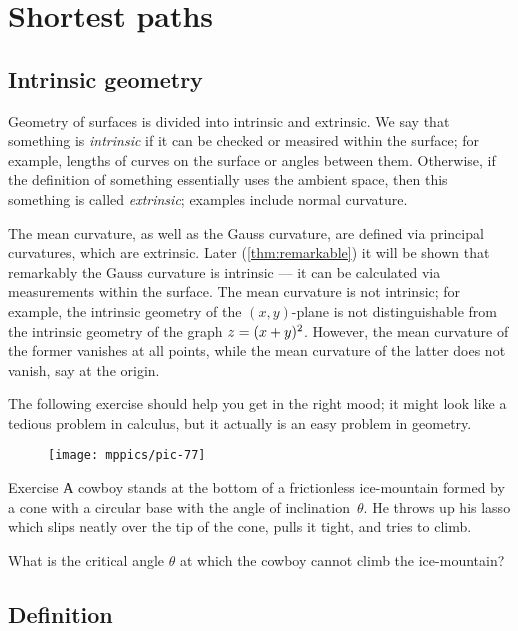 \chapter{Shortest paths}
\label{chap:shortest}

\section{Intrinsic geometry}

Geometry of surfaces is divided into intrinsic and extrinsic.
We say that something is \emph{intrinsic} if it can be checked or measired within the surface;
for example, lengths of curves on the surface or angles between them.
Otherwise, if the definition of something essentially uses the ambient space, then this something is called \emph{extrinsic};
examples include normal curvature.

The mean curvature, as well as the Gauss curvature, are defined via principal curvatures, which are extrinsic.
Later (\ref{thm:remarkable}) it will be shown that remarkably the Gauss curvature is intrinsic --- it can be calculated via measurements within the surface.
The mean curvature is not intrinsic; for example, the intrinsic geometry of the $(x,y)$-plane is not distinguishable from the intrinsic geometry of the graph $z\z=(x+y)^2$.
However, the mean curvature of the former vanishes at all points, while the mean curvature of the latter does not vanish, say at the origin.  

The following exercise should help you get in the right mood;
it might look like a tedious problem in calculus, but it actually is an easy problem in geometry.

\begin{wrapfigure}[6]{r}{33 mm}
\vskip-0mm
\centering
\texttt{[image: mppics/pic-77]}
\vskip-0mm
\end{wrapfigure}

\begin{thm}{Exercise}\label{ex:lasso}
А cowboy stands at the bottom of a frictionless ice-mountain formed by a cone with a circular base with the angle of inclination~$\theta$.
He throws up his lasso which slips neatly over the tip of the cone, pulls it tight, and tries to climb.

What is the critical angle $\theta$ at which the cowboy cannot climb the ice-mountain?
\end{thm}

\section{Definition}

